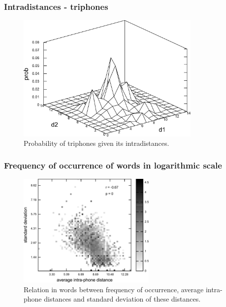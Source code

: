 \documentclass{beamer}
\begin{document}
\frame
{
  \frametitle{Intradistances - triphones}
  \vspace{-0.1cm}
  \begin{figure}[h]
  \centering  
  \includegraphics[width=0.8\textwidth]{images/ulysses_triphones_intradistances_mesh.pdf} 
  \caption{Probability of triphones given its intradistances.}
  \end{figure} 
}


\frame
{
  \frametitle{Frequency of occurrence of words in logarithmic scale}
  \vspace{-0.1cm}
  \begin{figure}[h]
  \centering
  \includegraphics[width=0.6\textwidth]{imagespresentation/ulysses_words_intra_phone_distance_freq_occ_avg_std.pdf}
  \caption{Relation in words between frequency of occurrence, average intra-phone distances and standard deviation of these distances.}
  \end{figure}
}
\end{document}
